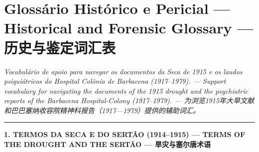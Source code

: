 \cleardoublepage
\thispagestyle{empty}
\chapter*{Glossário Histórico e Pericial --- Historical and Forensic Glossary --- 历史与鉴定词汇表}

\begingroup

\noindent\textit{Vocabulário de apoio para navegar os documentos da Seca de 1915 e os laudos psiquiátricos do Hospital Colônia de Barbacena (1917--1979). --- Support vocabulary for navigating the documents of the 1915 drought and the psychiatric reports of the Barbacena Hospital-Colony (1917--1979). --- 为浏览1915年大旱文献和巴巴塞纳收容院精神科报告（1917—1979）提供的辅助词汇。}

\vspace{0.8em}
\noindent\rule{\textwidth}{0.8pt}
\vspace{0.6em}

\noindent\textbf{1. TERMOS DA SECA E DO SERTÃO (1914--1915) --- TERMS OF THE DROUGHT AND THE SERTÃO --- 旱灾与塞尔唐术语}

